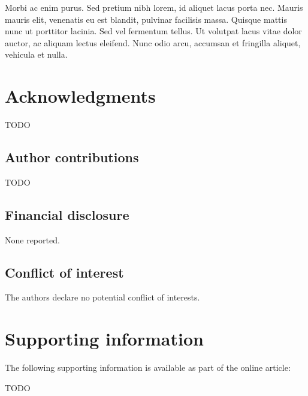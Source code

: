 \documentclass[AMA,STIX2COL,Linenumberson]{MRM}
\begin{document}
Morbi ac enim purus. Sed pretium nibh lorem, id aliquet lacus porta nec. Mauris mauris elit, venenatis eu est blandit, pulvinar facilisis massa. Quisque mattis nunc ut porttitor lacinia. Sed vel fermentum tellus. Ut volutpat lacus vitae dolor auctor, ac aliquam lectus eleifend. Nunc odio arcu, accumsan et fringilla aliquet, vehicula et nulla.

\section*{Acknowledgments}

TODO

\subsection*{Author contributions}

TODO

\subsection*{Financial disclosure}

None reported.

\subsection*{Conflict of interest}

The authors declare no potential conflict of interests.


\vfill\pagebreak

\section*{Supporting information}
The following supporting information is available as part of the online article:

TODO
\end{document}
